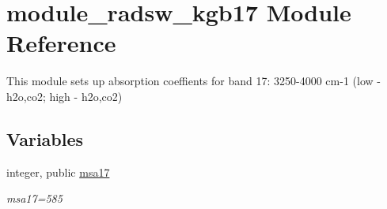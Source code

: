 \hypertarget{namespacemodule__radsw__kgb17}{}\section{module\+\_\+radsw\+\_\+kgb17 Module Reference}
\label{namespacemodule__radsw__kgb17}


This module sets up absorption coeffients for band 17\+: 3250-\/4000 cm-\/1 (low -\/ h2o,co2; high -\/ h2o,co2)  


\subsection*{Variables}
\begin{DoxyCompactItemize}
\item 
\mbox{\label{namespacemodule__radsw__kgb17_ac139ff93555c22e658cb767fa7142e08}} 
integer, public \hyperlink{namespacemodule__radsw__kgb17_ac139ff93555c22e658cb767fa7142e08}{msa17}
\begin{DoxyCompactList}\small\item\em msa17=585 \end{DoxyCompactList}\end{DoxyCompactItemize}
